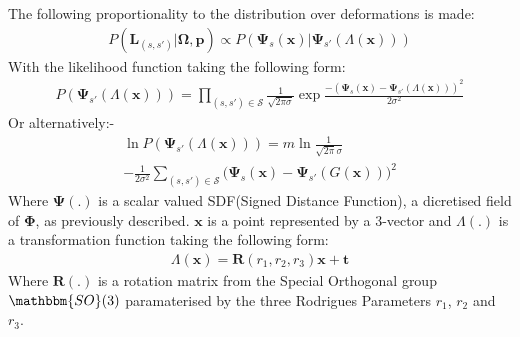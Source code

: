 The following proportionality to the distribution over deformations is made:
\begin{equation}
\begin{split}
P(\mathbf{L}_{(s, s')} | \mathbf{\Omega}, \mathbf{p}) \propto P(\mathbf{\Psi}_{s}(\mathbf{x}) | \mathbf{\Psi}_{s'}(\Lambda(\mathbf{x})))
\end{split}
\end{equation}
With the likelihood function taking the following form:
\begin{equation}
\begin{split}
P(\mathbf{\Psi}_{s'}(\Lambda(\mathbf{x}))) = \prod_{(s, s') \in \mathcal{S}} \frac{1}{\sqrt{2 \pi \sigma}} \exp{\frac{-(\mathbf{\Psi}_{s}(\mathbf{x}) - \mathbf{\Psi}_{s'}(\Lambda(\mathbf{x})))^2}{2\sigma^2}}
\end{split}
\end{equation}
Or alternatively:-
\begin{equation}
\begin{split}
\ln P(\mathbf{\Psi}_{s'}(\Lambda(\mathbf{x}))) = m\ln\frac{1}{\sqrt{2\pi}\sigma}\\
-\frac{1}{2\sigma^2} \sum_{(s, s') \in \mathcal{S}} \bigg( \mathbf{\Psi}_{s}(\mathbf{x}) - \mathbf{\Psi}_{s'}(G(\mathbf{x})) \bigg)^2
\end{split}
\end{equation}
Where $\mathbf{\Psi}(.)$ is a scalar valued SDF(Signed Distance Function), a dicretised field of $\mathbf{\Phi}$, as previously described. $\mathbf{x}$ is a point represented by a 3-vector and $\Lambda(.)$ is a transformation function taking the following form:
\begin{equation}
\begin{split}
\Lambda(\mathbf{x}) = \mathbf{R}(r_{1}, r_{2}, r_{3})\mathbf{x} + \mathbf{t}
\end{split}
\end{equation}
Where $\mathbf{R}(.)$ is a rotation matrix from the Special Orthogonal group $\mathbbm{SO}(3)$ paramaterised by the three 
Rodrigues Parameters\cite{Shuster1993} $r_{1}$, $r_{2}$ and $r_{3}$.


